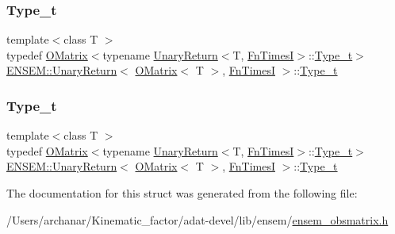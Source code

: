 \subsubsection{\texorpdfstring{Type\_t}{Type\_t}\hspace{0.1cm}{\footnotesize\ttfamily [2/3]}}
{\footnotesize\ttfamily template$<$class T $>$ \\
typedef \mbox{\hyperlink{classENSEM_1_1OMatrix}{O\+Matrix}}$<$typename \mbox{\hyperlink{structENSEM_1_1UnaryReturn}{Unary\+Return}}$<$T, \mbox{\hyperlink{structENSEM_1_1FnTimesI}{Fn\+TimesI}}$>$\+::\mbox{\hyperlink{structENSEM_1_1UnaryReturn_3_01OMatrix_3_01T_01_4_00_01FnTimesI_01_4_a823208991719b80307ceb78f0448f0de}{Type\+\_\+t}}$>$ \mbox{\hyperlink{structENSEM_1_1UnaryReturn}{E\+N\+S\+E\+M\+::\+Unary\+Return}}$<$ \mbox{\hyperlink{classENSEM_1_1OMatrix}{O\+Matrix}}$<$ T $>$, \mbox{\hyperlink{structENSEM_1_1FnTimesI}{Fn\+TimesI}} $>$\+::\mbox{\hyperlink{structENSEM_1_1UnaryReturn_3_01OMatrix_3_01T_01_4_00_01FnTimesI_01_4_a823208991719b80307ceb78f0448f0de}{Type\+\_\+t}}}

\mbox{\label{structENSEM_1_1UnaryReturn_3_01OMatrix_3_01T_01_4_00_01FnTimesI_01_4_a823208991719b80307ceb78f0448f0de}} 
\subsubsection{\texorpdfstring{Type\_t}{Type\_t}\hspace{0.1cm}{\footnotesize\ttfamily [3/3]}}
{\footnotesize\ttfamily template$<$class T $>$ \\
typedef \mbox{\hyperlink{classENSEM_1_1OMatrix}{O\+Matrix}}$<$typename \mbox{\hyperlink{structENSEM_1_1UnaryReturn}{Unary\+Return}}$<$T, \mbox{\hyperlink{structENSEM_1_1FnTimesI}{Fn\+TimesI}}$>$\+::\mbox{\hyperlink{structENSEM_1_1UnaryReturn_3_01OMatrix_3_01T_01_4_00_01FnTimesI_01_4_a823208991719b80307ceb78f0448f0de}{Type\+\_\+t}}$>$ \mbox{\hyperlink{structENSEM_1_1UnaryReturn}{E\+N\+S\+E\+M\+::\+Unary\+Return}}$<$ \mbox{\hyperlink{classENSEM_1_1OMatrix}{O\+Matrix}}$<$ T $>$, \mbox{\hyperlink{structENSEM_1_1FnTimesI}{Fn\+TimesI}} $>$\+::\mbox{\hyperlink{structENSEM_1_1UnaryReturn_3_01OMatrix_3_01T_01_4_00_01FnTimesI_01_4_a823208991719b80307ceb78f0448f0de}{Type\+\_\+t}}}



The documentation for this struct was generated from the following file\+:\begin{DoxyCompactItemize}
\item 
/\+Users/archanar/\+Kinematic\+\_\+factor/adat-\/devel/lib/ensem/\mbox{\hyperlink{adat-devel_2lib_2ensem_2ensem__obsmatrix_8h}{ensem\+\_\+obsmatrix.\+h}}\end{DoxyCompactItemize}
